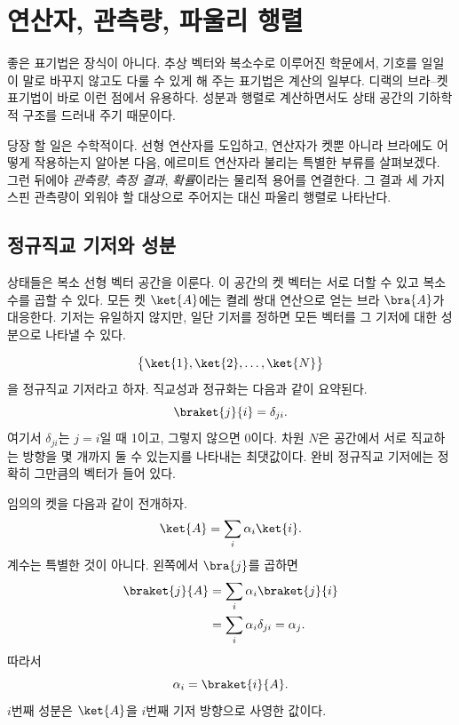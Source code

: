 \chapter{연산자, 관측량, 파울리 행렬}

좋은 표기법은 장식이 아니다. 추상 벡터와 복소수로 이루어진 학문에서, 기호를 일일이 말로 바꾸지 않고도 다룰 수 있게 해 주는 표기법은 계산의 일부다. 디랙의 브라--켓 표기법이 바로 이런 점에서 유용하다. 성분과 행렬로 계산하면서도 상태 공간의 기하학적 구조를 드러내 주기 때문이다.

당장 할 일은 수학적이다. 선형 연산자를 도입하고, 연산자가 켓뿐 아니라 브라에도 어떻게 작용하는지 알아본 다음, 에르미트 연산자라 불리는 특별한 부류를 살펴보겠다. 그런 뒤에야 \emph{관측량}, \emph{측정 결과}, \emph{확률}이라는 물리적 용어를 연결한다. 그 결과 세 가지 스핀 관측량이 외워야 할 대상으로 주어지는 대신 파울리 행렬로 나타난다.

\section{정규직교 기저와 성분}

상태들은 복소 선형 벡터 공간을 이룬다. 이 공간의 켓 벡터는 서로 더할 수 있고 복소수를 곱할 수 있다. 모든 켓 \(\ket{A}\)에는 켤레 쌍대 연산으로 얻는 브라 \(\bra{A}\)가 대응한다. 기저는 유일하지 않지만, 일단 기저를 정하면 모든 벡터를 그 기저에 대한 성분으로 나타낼 수 있다.

\[
\bigl\{\ket{1},\ket{2},\ldots,\ket{N}\bigr\}
\]
을 정규직교 기저라고 하자. 직교성과 정규화는 다음과 같이 요약된다.
\begin{equation}
\braket{j}{i}=\delta_{ji}.
\label{eq:orthonormal-basis}
\end{equation}
여기서 \(\delta_{ji}\)는 \(j=i\)일 때 1이고, 그렇지 않으면 0이다. 차원 \(N\)은 공간에서 서로 직교하는 방향을 몇 개까지 둘 수 있는지를 나타내는 최댓값이다. 완비 정규직교 기저에는 정확히 그만큼의 벡터가 들어 있다.

임의의 켓을 다음과 같이 전개하자.
\begin{equation}
\ket{A}=\sum_i \alpha_i\ket{i}.
\label{eq:ket-expansion}
\end{equation}
계수는 특별한 것이 아니다. 왼쪽에서 \(\bra{j}\)를 곱하면
\begin{align}
\braket{j}{A}
 &=\sum_i\alpha_i\braket{j}{i} \\
 &=\sum_i\alpha_i\delta_{ji}
 =\alpha_j.
\end{align}
따라서
\begin{equation}
\alpha_i=\braket{i}{A}.
\label{eq:components-inner-products}
\end{equation}
\(i\)번째 성분은 \(\ket{A}\)을 \(i\)번째 기저 방향으로 사영한 값이다.

